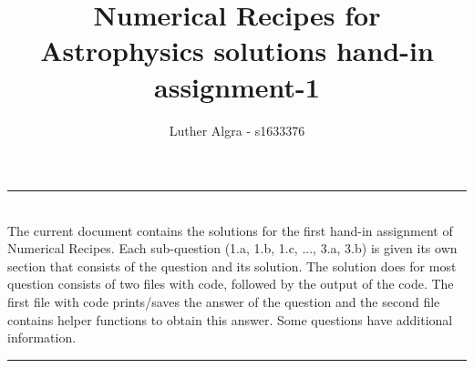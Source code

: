 \documentclass[a4paper,10pt]{article}
\title{\textbf{Numerical Recipes for Astrophysics solutions hand-in assignment-1}}
\author{Luther Algra - s1633376}
\renewenvironment{abstract}
 { \vspace*{0.3cm} \textbf{\abstractname} \vspace{0.1cm} \\ \ignorespaces}
 {\par\medskip \vspace{0.1cm}}
\begin{document}
\maketitle

\hrule
\begin{abstract}
The current document contains the solutions for the first hand-in assignment of Numerical Recipes. Each sub-question (1.a, 1.b, 1.c, ..., 3.a, 3.b) is given its own section that consists of the question and its solution. The solution does for most question consists of two files with code, followed by the output of the code. The first file with code prints/saves the answer of the question and the second file contains helper functions to obtain this answer. Some questions have additional information.

\end{abstract}
\hrule
\vspace{0.5cm}
















  
\end{document}
